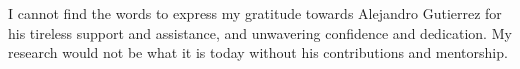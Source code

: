 \documentclass[edeposit,10pt,fullpage]{uiucthesis2009}
\begin{document}
I cannot find the words to express my gratitude towards Alejandro Gutierrez for his tireless support and assistance, and unwavering confidence and dedication. My research would not be what it is today without his contributions and mentorship. %



\tableofcontents
\listoftables
\listoffigures


%



\mainmatter











\appendix*

%

\backmatter


%

\end{document}
